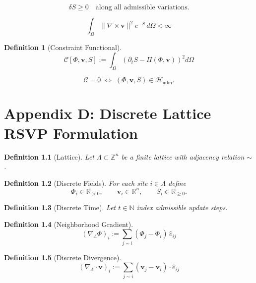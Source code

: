 \documentclass[11pt,oneside]{book}
\newtheorem{definition}{Definition}[chapter]
\begin{document}
\begin{constraint}
\[
\delta S \ge 0 \quad\text{along all admissible variations}.
\]
\end{constraint}

\begin{constraint}
\[
\int_\Omega \|\nabla\times\mathbf{v}\|^2 e^{-S}\, d\Omega
< \infty
\]
\end{constraint}

\begin{definition}[Constraint Functional]
\[
\mathcal{C}[\Phi,\mathbf{v},S]
:= \int_\Omega \left(
\partial_t S
- \Pi(\Phi,\mathbf{v})
\right)^2 d\Omega
\]
\end{definition}

\begin{axiom}
\[
\mathcal{C} = 0
\;\Longleftrightarrow\;
(\Phi,\mathbf{v},S)\in\mathcal{H}_{\mathrm{adm}}.
\]
\end{axiom}

\chapter{Appendix D: Discrete Lattice RSVP Formulation}

\begin{definition}[Lattice]
Let $\Lambda \subset \mathbb{Z}^n$ be a finite lattice with adjacency relation $\sim$.
\end{definition}

\begin{definition}[Discrete Fields]
For each site $i\in\Lambda$ define
\[
\Phi_i \in \mathbb{R}_{>0},\qquad
\mathbf{v}_i \in \mathbb{R}^n,\qquad
S_i \in \mathbb{R}_{\ge 0}.
\]
\end{definition}

\begin{definition}[Discrete Time]
Let $t\in\mathbb{N}$ index admissible update steps.
\end{definition}

\begin{definition}[Neighborhood Gradient]
\[
(\nabla_\Lambda \Phi)_i
:= \sum_{j\sim i} (\Phi_j - \Phi_i)\,\hat{e}_{ij}
\]
\end{definition}

\begin{definition}[Discrete Divergence]
\[
(\nabla_\Lambda\cdot\mathbf{v})_i
:= \sum_{j\sim i} (\mathbf{v}_j-\mathbf{v}_i)\cdot\hat{e}_{ij}
\]
\end{definition}
\end{document}
